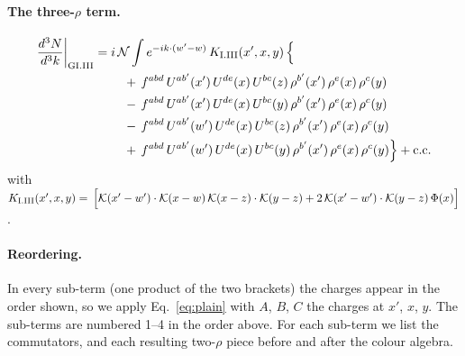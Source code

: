 \documentclass[10pt]{article}
\numberwithin{equation}{section}
\newcommand{\KK}{\mathcal K}
\newcommand{\NN}{\mathcal N}
\begin{document}
\paragraph{The three-$\rho$ term.}
\begin{align}
\frac{d^3N}{d^3k}\bigg|_{\rm GI.III}={}&i\,\NN\int e^{-ik\cdot(w'-w)}\,K_{\rm I.III}(x',x,y)\,\Big\{\notag\\
&\quad +\,f^{abd}\,U^{ab'}(x')\,U^{de}(x)\,U^{bc}(z)\,\rho^{b'}(x')\,\rho^{e}(x)\,\rho^{c}(y)\notag\\
&\quad -\,f^{abd}\,U^{ab'}(x')\,U^{de}(x)\,U^{bc}(y)\,\rho^{b'}(x')\,\rho^{e}(x)\,\rho^{c}(y)\notag\\
&\quad -\,f^{abd}\,U^{ab'}(w')\,U^{de}(x)\,U^{bc}(z)\,\rho^{b'}(x')\,\rho^{e}(x)\,\rho^{c}(y)\notag\\
&\quad +\,f^{abd}\,U^{ab'}(w')\,U^{de}(x)\,U^{bc}(y)\,\rho^{b'}(x')\,\rho^{e}(x)\,\rho^{c}(y)\Big\}+{\rm c.c.}\label{eq:in-GI.III}
\end{align}
with $K_{\rm I.III}(x',x,y)=\,\Big[\KK(x'-w')\cdot\KK(x-w)\,\KK(x-z)\cdot\KK(y-z)+2\,\KK(x'-w')\cdot\KK(y-z)\,\Phi(x)\Big]$.
\paragraph{Reordering.} In every sub-term (one product of the two brackets) the charges appear in the order shown, so we apply Eq.~\eqref{eq:plain} with $A$, $B$, $C$ the charges at $x'$, $x$, $y$. The sub-terms are numbered 1--4 in the order above. For each sub-term we list the commutators, and each resulting two-$\rho$ piece before and after the colour algebra.
\end{document}
